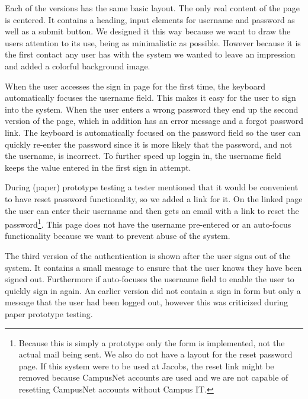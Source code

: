 Each of the versions has the same basic layout. The only real content of the page is centered. It contains a heading, input elements for username and password as well as a submit button. We designed it this way because we want to draw the users attention to its use, being as minimalistic as possible. However because it is the first contact any user has with the system we wanted to leave an impression and added a colorful background image.

When the user accesses the sign in page for the first time, the keyboard automatically focuses the username field. This makes it easy for the user to sign into the system. When the user enters a wrong password they end up the second version of the page, which in addition has an error message and a forgot password link. The keyboard is automatically focused on the password field so the user can quickly re-enter the password since it is more likely that the password, and not the username, is incorrect. To further speed up loggin in, the username field keeps the value entered in the first sign in attempt.

During (paper) prototype testing a tester mentioned that it would be convenient to have reset password functionality, so we added a link for it.  On the linked page the user can enter their username and then gets an email with a link to reset the password\footnote{Because this is simply a prototype only the form is implemented, not the actual mail being sent. We also do not have a layout for the reset password page. If this system were to be used at Jacobs, the reset link might be removed because CampusNet accounts are used and we are not capable of resetting CampusNet accounts without Campus IT.}. This page does not have the username pre-entered or an auto-focus functionality because we want to prevent abuse of the system.

The third version of the authentication is shown after the user signs out of the system. It contains a small message to ensure that the user knows they have been signed out. Furthermore if auto-focuses the username field to enable the user to quickly sign in again. An earlier version did not contain a sign in form but only a message that the user had been logged out, however this was criticized during paper prototype testing. 
